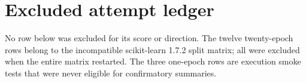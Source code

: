 \chapter{Excluded attempt ledger}\label{s1:ch:app10_excluded_attempt_ledger}

No row below was excluded for its score or direction. The twelve twenty-epoch rows belong to the incompatible scikit-learn 1.7.2 split matrix; all were excluded when the entire matrix restarted. The three one-epoch rows are execution smoke tests that were never eligible for confirmatory summaries.

\begin{landscape}
\small
\setlength{\tabcolsep}{4pt}

\end{landscape}
